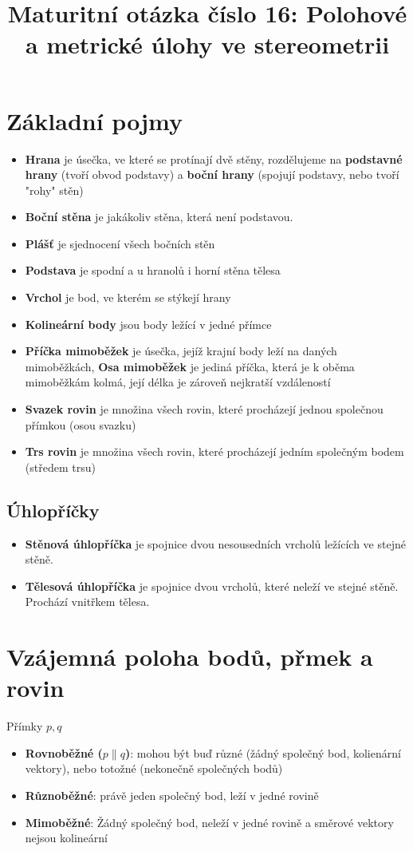 \documentclass[12pt]{article}
\title{Maturitní otázka číslo 16: Polohové a metrické úlohy ve stereometrii }
\author{}
\date{}
\begin{document}
\maketitle

\section*{Základní pojmy}
\begin{itemize} [itemsep = 2pt]
    \item \textbf{Hrana} je úsečka, ve které se protínají dvě stěny, rozdělujeme na \textbf{podstavné hrany} (tvoří obvod podstavy) a \textbf{boční hrany} (spojují podstavy, nebo tvoří "rohy" stěn)
    \item \textbf{Boční stěna} je jakákoliv stěna, která není podstavou.
    \item \textbf{Plášť} je sjednocení všech bočních stěn
    \item \textbf{Podstava} je spodní a u hranolů i horní stěna tělesa
    \item \textbf{Vrchol} je bod, ve kterém se stýkejí hrany
    \item \textbf{Kolineární body} jsou body ležící v jedné přímce
    \item \textbf{Příčka mimoběžek} je úsečka, jejíž krajní body leží na daných mimoběžkách, \textbf{Osa mimoběžek} je jediná příčka, která je k oběma mimoběžkám kolmá, její délka je zároveň nejkratší vzdáleností
    \item \textbf{Svazek rovin} je množina všech rovin, které procházejí jednou společnou přímkou (osou svazku)
    \item \textbf{Trs rovin} je množina všech rovin, které procházejí jedním společným bodem (středem trsu)
\end{itemize}

\subsection*{Úhlopříčky}
\begin{itemize} [itemsep = 2pt]
    \item \textbf{Stěnová úhlopříčka} je spojnice dvou nesousedních vrcholů ležících ve stejné stěně.
    \item \textbf{Tělesová úhlopříčka} je spojnice dvou vrcholů, které neleží ve stejné stěně. Prochází vnitřkem tělesa.
\end{itemize}

\section*{Vzájemná poloha bodů, přmek a rovin}
Přímky $p, q$
\begin{itemize} [itemsep = 2pt]
    \item \textbf{Rovnoběžné ($p \| q$)}: mohou být buď různé (žádný společný bod, kolienární vektory), nebo totožné (nekonečně společných bodů)
    \item \textbf{Různoběžné}: právě jeden společný bod, leží v jedné rovině
    \item \textbf{Mimoběžné}: Žádný společný bod, neleží v jedné rovině a směrové vektory nejsou kolineární
\end{itemize}
\end{document}
